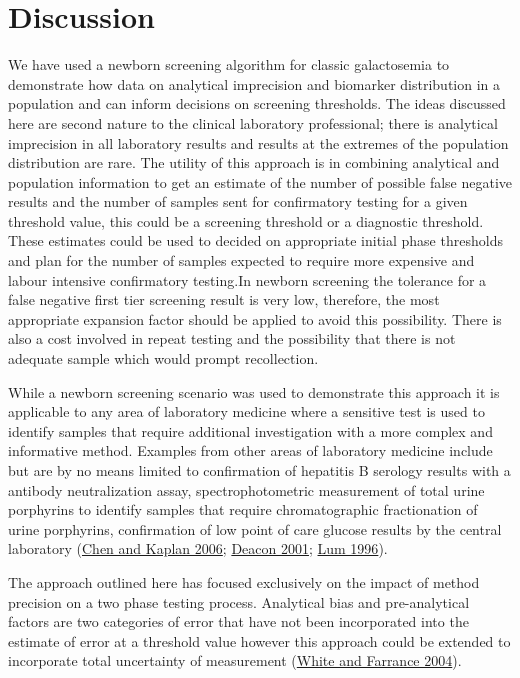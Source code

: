 \documentclass[review]{elsarticle}
\begin{document}
\clearpage

\section*{Discussion}
\label{sec:org77dc31d}

We have used a newborn screening algorithm for classic galactosemia to
demonstrate how data on analytical imprecision and biomarker
distribution in a population and can inform decisions on screening
thresholds. The ideas discussed here are second nature to the clinical
laboratory professional; there is analytical imprecision in all
laboratory results and results at the extremes of the population
distribution are rare. The utility of this approach is in combining
analytical and population information to get an estimate of the number
of possible false negative results and the number of samples sent for
confirmatory testing for a given threshold value, this could be a
screening threshold or a diagnostic threshold. These estimates could
be used to decided on appropriate initial phase thresholds and plan
for the number of samples expected to require more expensive and
labour intensive confirmatory testing.In newborn screening the
tolerance for a false negative first tier screening result is very
low, therefore, the most appropriate expansion factor should be
applied to avoid this possibility. There is also a cost involved in
repeat testing and the possibility that there is not adequate sample
which would prompt recollection.

While a newborn screening scenario was used to demonstrate this
approach it is applicable to any area of laboratory medicine where a
sensitive test is used to identify samples that require additional
investigation with a more complex and informative method. Examples
from other areas of laboratory medicine include but are by no means
limited to confirmation of hepatitis B serology results with a
antibody neutralization assay, spectrophotometric measurement of total
urine porphyrins to identify samples that require chromatographic
fractionation of urine porphyrins, confirmation of low point of care
glucose results by the central laboratory (\hyperlink{citeproc_bib_item_2}{Chen and Kaplan 2006}; \hyperlink{citeproc_bib_item_4}{Deacon 2001}; \hyperlink{citeproc_bib_item_6}{Lum 1996}).

The approach outlined here has focused exclusively on the impact of
method precision on a two phase testing process. Analytical bias and
pre-analytical factors are two categories of error that have not been
incorporated into the estimate of error at a threshold value however
this approach could be extended to incorporate total uncertainty of
measurement (\hyperlink{citeproc_bib_item_11}{White and Farrance 2004}).
\end{document}
